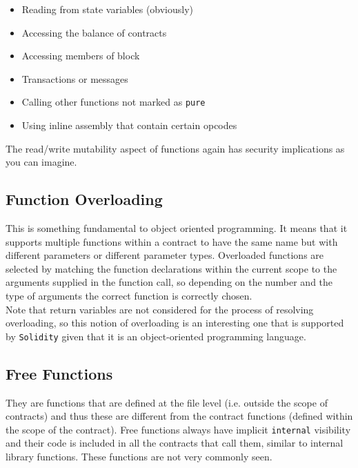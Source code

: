 \begin{itemize}
   \begin{itemize}
      
      \item Reading from state variables (obviously)
      
      \item Accessing the balance of contracts
      
      \item Accessing members of block
      
      \item Transactions or messages
      
      \item Calling other functions not marked as \texttt{pure}
      
      \item Using inline assembly that contain certain opcodes
   
   \end{itemize}

\end{itemize}

The read/write mutability aspect of functions again has security implications as you can imagine.

\subsection*{Function Overloading}

This is something fundamental to object oriented programming.
It means that it supports multiple functions within a contract to have the same name but with different parameters or different parameter types.
Overloaded functions are selected by matching the function declarations within the current scope to the arguments supplied in the function call, so depending on the number and the type of arguments the correct function is correctly chosen.\\

Note that return variables are not considered for the process of resolving overloading, so this notion of overloading is an interesting one that is supported by \texttt{Solidity} given that it is an object-oriented programming language.

\subsection*{Free Functions}

They are functions that are defined at the file level (i.e. outside the scope of contracts) and thus these are different from the contract functions (defined within the scope of the contract).
Free functions always have implicit \texttt{internal} visibility and their code is included in all the contracts that call them, similar to internal library functions.
These functions are not very commonly seen.


